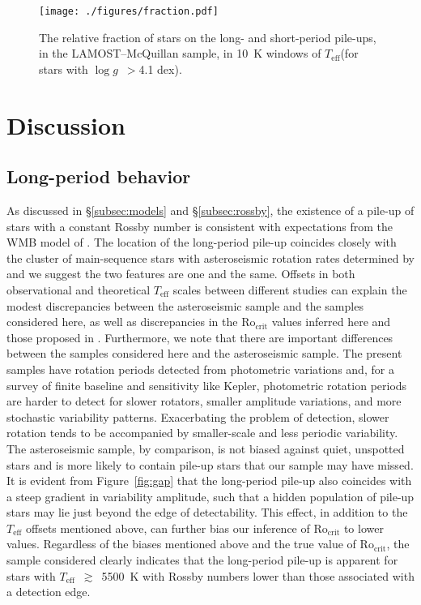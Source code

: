 \documentclass[trackchanges,twocolumn]{aastex631}
\newcommand{\rocrit}{$\mathrm{Ro_{crit}}$\xspace}
\newcommand{\lamostmcq}{LAMOST--McQuillan\xspace}
\newcommand{\teffmin}{5500~K\xspace}
\newcommand{\teff}{\ensuremath{T_{\mathrm{eff}}}\xspace}
\newcommand{\logg}{\ensuremath{\log g}\xspace}
\begin{document}
\begin{figure}
    \centering
    \texttt{[image: ./figures/fraction.pdf]}
    \caption{The relative fraction of stars on the long- and short-period pile-ups, in the \lamostmcq sample, in 10~K windows of \teff (for stars with \logg~$>$4.1 dex).}
    \label{fig:fraction}
\end{figure}


\section{Discussion} \label{sec:discussion}

\subsection{Long-period behavior} \label{subsec:longperiod}

As discussed in \S\ref{subsec:models} and \S\ref{subsec:rossby}, the existence of a pile-up of stars with a constant Rossby number is consistent with expectations from the WMB model of \citet{vanSaders2016, vanSaders2019}. The location of the long-period pile-up coincides closely with the cluster of main-sequence stars with asteroseismic rotation rates determined by \citet{Hall2021} and we suggest the two features are one and the same. Offsets in both observational and theoretical \teff scales between different studies can explain the modest discrepancies between the asteroseismic sample and the samples considered here, as well as discrepancies in the \rocrit values inferred here and those proposed in \citet{vanSaders2019}. Furthermore, we note that there are important differences between the samples considered here and the \citet{Hall2021} asteroseismic sample. The present samples have rotation periods detected from photometric variations and, for a survey of finite baseline and sensitivity like Kepler, photometric rotation periods are harder to detect for slower rotators, smaller amplitude variations, and more stochastic variability patterns. Exacerbating the problem of detection, slower rotation tends to be accompanied by smaller-scale and less periodic variability. The asteroseismic sample, by comparison, is not biased against quiet, unspotted stars and is more likely to contain pile-up stars that our sample may have missed. It is evident from Figure~\ref{fig:gap} that the long-period pile-up also coincides with a steep gradient in variability amplitude, such that a hidden population of pile-up stars may lie just beyond the edge of detectability. This effect, in addition to the \teff offsets mentioned above, can further bias our inference of \rocrit to lower values. Regardless of the biases mentioned above and the true value of \rocrit, the sample considered clearly indicates that the long-period pile-up is apparent for stars with \teff~$\gtrsim$~\teffmin with Rossby numbers lower than those associated with a detection edge.
\end{document}
